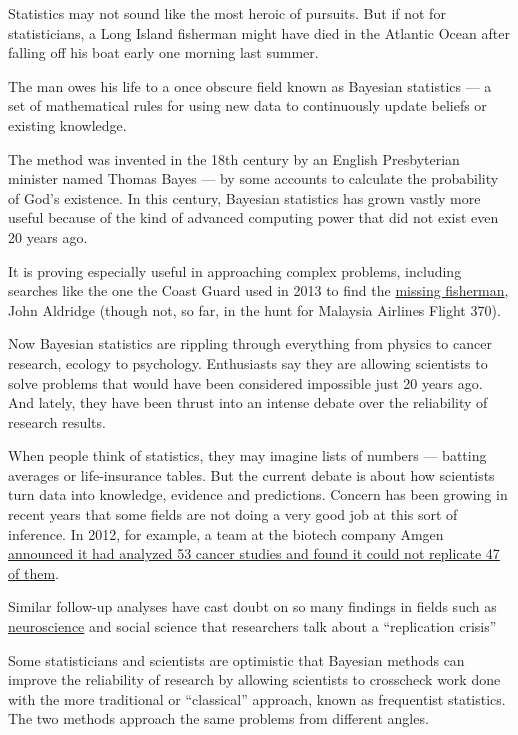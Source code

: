 Statistics may not sound like the most heroic of pursuits. But if not
for statisticians, a Long Island fisherman might have died in the
Atlantic Ocean after falling off his boat early one morning last summer.

The man owes his life to a once obscure field known as Bayesian
statistics --- a set of mathematical rules for using new data to
continuously update beliefs or existing knowledge.

The method was invented in the 18th century by an English Presbyterian
minister named Thomas Bayes --- by some accounts to calculate the
probability of God's existence. In this century, Bayesian statistics has
grown vastly more useful because of the kind of advanced computing power
that did not exist even 20 years ago.

It is proving especially useful in approaching complex problems,
including searches like the one the Coast Guard used in 2013 to find the
\href{http://www.nytimes.com/2014/01/05/magazine/a-speck-in-the-sea.html?_r=0}{missing
fisherman}, John Aldridge (though not, so far, in the hunt for Malaysia
Airlines Flight 370).

Now Bayesian statistics are rippling through everything from physics to
cancer research, ecology to psychology. Enthusiasts say they are
allowing scientists to solve problems that would have been considered
impossible just 20 years ago. And lately, they have been thrust into an
intense debate over the reliability of research results.

When people think of statistics, they may imagine lists of numbers ---
batting averages or life-insurance tables. But the current debate is
about how scientists turn data into knowledge, evidence and predictions.
Concern has been growing in recent years that some fields are not doing
a very good job at this sort of inference. In 2012, for example, a team
at the biotech company Amgen
\href{http://www.nature.com/nature/journal/v483/n7391/full/483531a.html}{announced
it had analyzed 53 cancer studies and found it could not replicate 47 of
them}.

Similar follow-up analyses have cast doubt on so many findings in fields
such as
\href{http://www.nature.com/nrn/journal/v14/n5/abs/nrn3475.html}{neuroscience}
and social science that researchers talk about a ``replication crisis''

Some statisticians and scientists are optimistic that Bayesian methods
can improve the reliability of research by allowing scientists to
crosscheck work done with the more traditional or ``classical''
approach, known as frequentist statistics. The two methods approach the
same problems from different angles.

